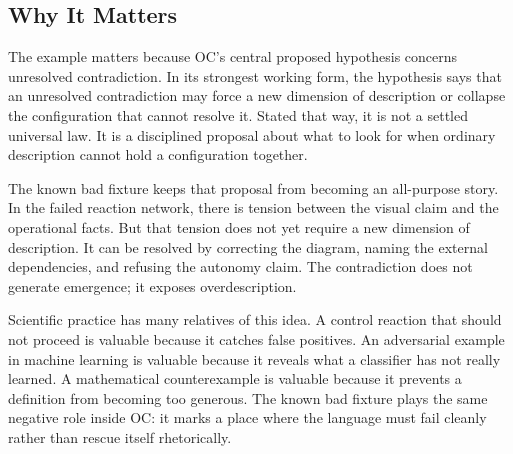 \documentclass[11pt,a4paper,openany]{book}
\begin{document}
\subsection{Why It Matters}
The example matters because OC's central proposed hypothesis concerns unresolved contradiction. In its strongest working form, the hypothesis says that an unresolved contradiction may force a new dimension of description or collapse the configuration that cannot resolve it. Stated that way, it is not a settled universal law. It is a disciplined proposal about what to look for when ordinary description cannot hold a configuration together. \cite{haken_synergetics,nicolis_prigogine_selforg}\par
The known bad fixture keeps that proposal from becoming an all-purpose story. In the failed reaction network, there is tension between the visual claim and the operational facts. But that tension does not yet require a new dimension of description. It can be resolved by correcting the diagram, naming the external dependencies, and refusing the autonomy claim. The contradiction does not generate emergence; it exposes overdescription.\par
Scientific practice has many relatives of this idea. A control reaction that should not proceed is valuable because it catches false positives. An adversarial example in machine learning is valuable because it reveals what a classifier has not really learned. A mathematical counterexample is valuable because it prevents a definition from becoming too generous. The known bad fixture plays the same negative role inside OC: it marks a place where the language must fail cleanly rather than rescue itself rhetorically.\par
\end{document}
